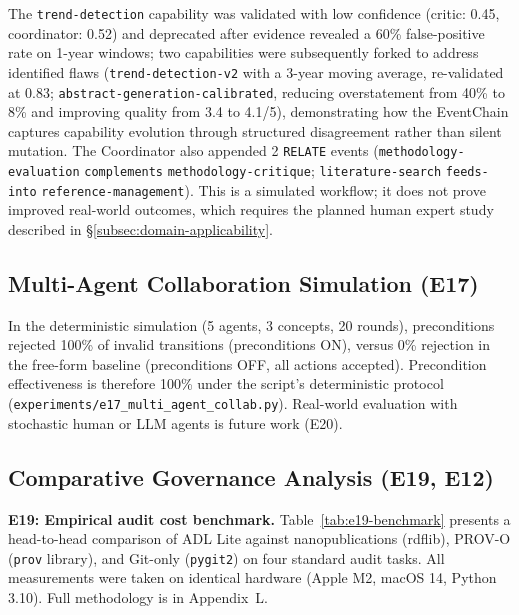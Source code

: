 The \texttt{trend-detection} capability was validated with low confidence (critic: 0.45, coordinator: 0.52) and deprecated after evidence revealed a 60\% false-positive rate on 1-year windows; two capabilities were subsequently forked to address identified flaws (\texttt{trend-detection-v2} with a 3-year moving average, re-validated at 0.83; \texttt{abstract-generation-calibrated}, reducing overstatement from 40\% to 8\% and improving quality from 3.4 to 4.1/5), demonstrating how the EventChain captures capability evolution through structured disagreement rather than silent mutation. The Coordinator also appended 2 \texttt{RELATE} events (\texttt{methodology-evaluation} \texttt{complements} \texttt{methodology-critique}; \texttt{literature-search} \texttt{feeds-into} \texttt{reference-management}). This is a simulated workflow; it does not prove improved real-world outcomes, which requires the planned human expert study described in \S\ref{subsec:domain-applicability}.

\subsection{Multi-Agent Collaboration Simulation (E17)}\label{subsec:e17}

In the deterministic simulation (5 agents, 3 concepts, 20 rounds), preconditions rejected 100\% of invalid transitions (preconditions ON), versus 0\% rejection in the free-form baseline (preconditions OFF, all actions accepted). Precondition effectiveness is therefore 100\% under the script's deterministic protocol (\texttt{experiments/e17\_multi\_agent\_collab.py}). Real-world evaluation with stochastic human or LLM agents is future work (E20).

\subsection{Comparative Governance Analysis (E19, E12)}\label{subsec:comparative-analysis}

\textbf{E19: Empirical audit cost benchmark.} Table~\ref{tab:e19-benchmark} presents a head-to-head comparison of ADL Lite against nanopublications (rdflib), PROV-O (\texttt{prov} library), and Git-only (\texttt{pygit2}) on four standard audit tasks. All measurements were taken on identical hardware (Apple M2, macOS 14, Python 3.10). Full methodology is in Appendix~L.

